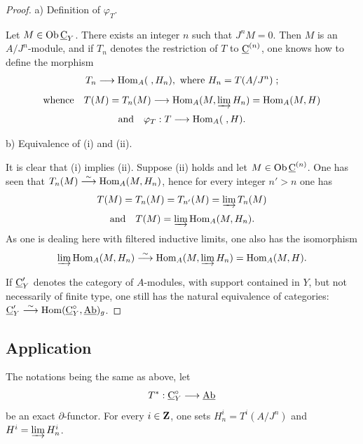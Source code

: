 \begin{proof}
a) Definition of $\varphi_{T}$.

Let $M\in \operatorname{Ob} \underline{\mathrm{C}}_{Y}$. There exists an integer $n$ such that $J^{n}M=0$. Then $M$ is an $A/J^{n}$-module, and if $T_{n}$ denotes the restriction of $T$ to $\underline{\mathrm{C}}^{(n)}$, one knows how to define the morphism
\begin{eqnarray*}
T_{n}\to \Hom_{A}(\;, H_{n}), \ \hbox{where}\ H_{n}=T(A/J^{n})\;;
\end{eqnarray*}
\begin{equation*}
\text{whence}\quad T(M)=T_{n}(M)\to \Hom_{A}(M, \varinjlim H_{n})= \Hom_{A}(M, H)
\end{equation*}
\begin{equation*}
\text{and}\quad \varphi_{T}: T\to \Hom_{A}(\;, H).
\end{equation*}

b) Equivalence of (i) and (ii).

It is clear that (i) implies (ii). Suppose (ii) holds and let $M\in \operatorname{Ob} \underline{\mathrm{C}}^{(n)}$. One has seen that $T_{n}(M)\overset{\sim}{\longrightarrow} \operatorname{Hom}_{A}(M, H_{n})$, hence for every integer $n'>n$ one has
\begin{equation*} T(M)=T_{n}(M)=T_{n'}(M)=\varinjlim T_{n}(M)
\end{equation*}
\begin{equation*}
\text{and}\quad T(M)=\varinjlim \operatorname{Hom}_{A}(M, H_{n}).
\end{equation*}
As one is dealing here with filtered inductive limits, one also has the isomorphism
\begin{equation*} \varinjlim \operatorname{Hom}_{A}(M, H_{n})\overset{\sim}{\longrightarrow} \operatorname{Hom}_{A}(M, \varinjlim H_{n}) = \operatorname{Hom}_{A}(M, H).
\end{equation*}

If $\underline{\mathrm{C}}'_{Y}$ denotes the category of $A$-modules, with support contained in $Y$, but not necessarily of finite type, one still has the natural equivalence of categories: \hbox{$\underline{\mathrm{C}}'_{Y}\overset{\sim}{\longrightarrow} \operatorname{Hom} (\underline{\mathrm{C}}_{Y}^{\circ}, \underline{\mathrm{Ab}})_{g}$}.
\skipqed
\end{proof}

\subsection*{Application}
The notations being the same as above, let
\begin{equation*} T^{*}:\ccat_{Y}^{\circ}\to{\Ab}
\end{equation*}
be an exact $\partial$-functor. For every $i\in \mathbf{Z}$, one sets $H^{i}_{n}=T^{i}(A/J^{n})$ and $H^{i}=\varinjlim H^{i}_{n}$.

